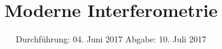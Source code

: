 
\subject{V64}
\title{Moderne Interferometrie}
\date{
  Durchführung: 04. Juni 2017
  \hspace{3em}
  Abgabe: 10. Juli 2017
}



\maketitle
\newpage
\mbox{}
\newpage
\thispagestyle{empty}
\tableofcontents
\newpage






\nocite{numpy}
\nocite{matplotlib}
\nocite{uncertainties}
\printbibliography


